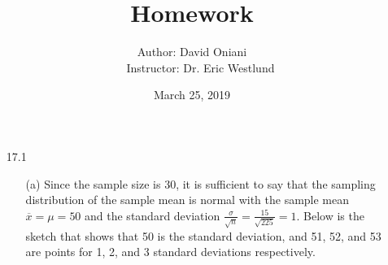 \documentclass[11pt, a4paper]{article}
\title{\bf{Homework \textnumero 12}}
\author{Author: David Oniani
\\
\ \ \ Instructor: Dr. Eric Westlund}
\date{March 25, 2019}
\begin{document}
\maketitle
\begin{itemize}
\item[17.1]
\begin{itemize}
\item[(a)]
Since the sample size is 30, it is sufficient to say that the sampling
distribution of the sample mean is normal with the sample mean $\overline{x} = \mu = 50$
and the standard deviation $\frac{\sigma}{\sqrt{n}} = \frac{15}{\sqrt{225}} = 1.$
Below is the sketch that shows that 50 is the standard deviation, and 51, 52, and 53 are
points for 1, 2, and 3 standard deviations respectively.
\item[]
\item[]
\item[]
\begin{center}
\end{center}

\item[]

\item[]


\end{itemize}
\end{itemize}
\end{document}
